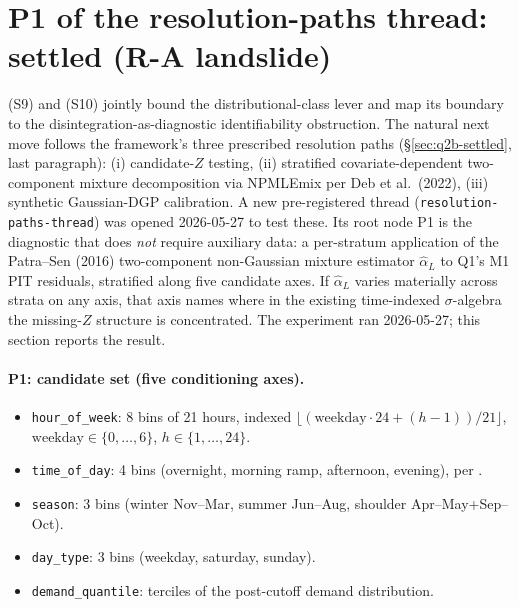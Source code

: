 \documentclass[11pt]{article}
\theoremstyle{definition}
\theoremstyle{plain}
\begin{document}
\section{P1 of the resolution-paths thread: settled (R-A landslide)}
\label{sec:p1-settled}

(S9) and (S10) jointly bound the distributional-class lever and map
its boundary to the disintegration-as-diagnostic identifiability
obstruction. The natural next move follows the framework's three
prescribed resolution paths (\S\ref{sec:q2b-settled}, last paragraph):
(i) candidate-$Z$ testing, (ii) stratified covariate-dependent
two-component mixture decomposition via NPMLEmix per Deb et al.\
(2022), (iii) synthetic Gaussian-DGP calibration. A new pre-registered
thread (\texttt{resolution-paths-thread}) was opened 2026-05-27 to
test these. Its root node P1 is the diagnostic that does \emph{not}
require auxiliary data: a per-stratum application of the
Patra--Sen (2016) two-component non-Gaussian mixture estimator
$\hat\alpha_L$ to Q1's M1 PIT residuals, stratified along five
candidate axes. If $\hat\alpha_L$ varies materially across strata
on any axis, that axis names where in the existing time-indexed
$\sigma$-algebra the missing-$Z$ structure is concentrated. The
experiment ran 2026-05-27; this section reports the result.

\paragraph{P1: candidate set (five conditioning axes).}
\begin{itemize}[leftmargin=2em]
\item \texttt{hour\_of\_week}: 8 bins of 21 hours, indexed
\(\lfloor (\mathrm{weekday}\cdot 24 + (h{-}1))/21 \rfloor\),
\(\mathrm{weekday}\in\{0,\ldots,6\}\), \(h\in\{1,\ldots,24\}\).
\item \texttt{time\_of\_day}: 4 bins (overnight, morning ramp,
afternoon, evening), per
.
\item \texttt{season}: 3 bins (winter Nov--Mar, summer Jun--Aug,
shoulder Apr--May+Sep--Oct).
\item \texttt{day\_type}: 3 bins (weekday, saturday, sunday).
\item \texttt{demand\_quantile}: terciles of the post-cutoff
demand distribution.
\end{itemize}
\end{document}
